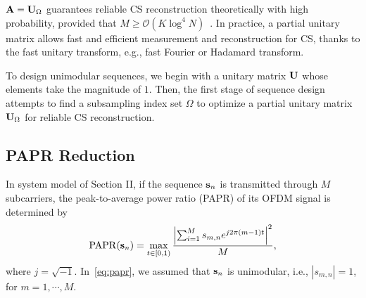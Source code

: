 \documentclass[journal]{IEEEtran}
\newcommand{\Z}{\ensuremath{\mathbb Z}}
\newcommand{\mO}{\mathcal{O}}
\newcommand{\abu}{{\bf a}}
\newcommand{\bbu}{{\bf b}}
\newcommand{\sbu}{{\bf s}}
\newcommand{\xbu}{{\bf x}}
\newcommand{\ybu}{{\bf y}}
\newcommand{\Abu}{{\bf A}}
\newcommand{\Sbu}{{\bf S}}
\newcommand{\Ubu}{{\bf U}}
\numberwithin{const2}{const}
\begin{document}
$\Abu = \Ubu_\Omega$ %
guarantees reliable CS reconstruction %
theoretically with high probability,
provided that $M \geq \mO ( K \log^4 N)$~\cite{Rud:sparse}.
In practice, a partial unitary matrix allows fast and efficient measurement and reconstruction for CS,
thanks to the fast unitary transform, e.g., fast Fourier or Hadamard transform.

To design unimodular sequences, 
we begin with a unitary matrix $\Ubu$ whose elements take the magnitude of $1$.
Then, the first stage of sequence design 
attempts to find a subsampling index set $\Omega$
to optimize a partial unitary matrix $\Ubu_\Omega$ for reliable CS reconstruction.



\subsection{PAPR Reduction}
In system model of Section II, 
if the sequence $\sbu_n $ %
is transmitted through $M$ subcarriers,
the peak-to-average power ratio (PAPR) of its OFDM signal is determined by~\cite{Litsyn:peak}
\begin{equation}\label{eq:papr}
	{\rm PAPR} (\sbu_n)= \max_{t \in [0, 1) } 
	\frac{ \left| \sum_{i=1} ^{M} s_{m, n} e^{j 2 \pi (m-1) t} \right|^2 }{ M} ,
\end{equation}
where $j=\sqrt{-1}$.
In~\eqref{eq:papr}, we assumed that $\sbu_n $ is unimodular, i.e., $|s_{m, n}| =1$, for $m=1, \cdots, M$. 
\end{document}
